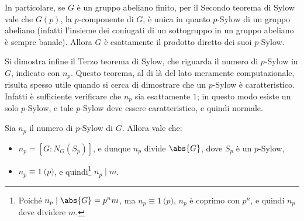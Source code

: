 \documentclass[12pt]{scrartcl}
\begin{document}
	\begin{remark}
		In particolare, se $G$ è un gruppo abeliano finito, per il
		Secondo teorema di Sylow vale che $G(p)$, la $p$-componente
		di $G$, è unica in quanto $p$-Sylow di un gruppo abeliano
		(infatti l'insieme dei coniugati di un sottogruppo in un gruppo abeliano è sempre banale). Allora $G$ è esattamente
		il prodotto diretto dei suoi $p$-Sylow.
	\end{remark}
	
	\bigskip
	
	
	Si dimostra infine il Terzo teorema di Sylow, che riguarda
	il numero di $p$-Sylow in $G$, indicato con $n_p$. Questo
	teorema, al di là del lato meramente computazionale, risulta
	spesso utile quando si cerca di dimostrare che un $p$-Sylow
	è caratteristico. Infatti è sufficiente verificare che
	$n_p$ sia esattamente $1$; in questo modo esiste un solo
	$p$-Sylow, e tale $p$-Sylow deve essere caratteristico, e
	quindi normale.
	
	\begin{theorem}
		Sia $n_p$ il numero di $p$-Sylow di $G$. Allora vale
		che:
		
		\begin{itemize}
			\item $n_p = [G : N_G(S_p)]$, e dunque $n_p$ divide $\abs{G}$, dove
				$S_p$ è un $p$-Sylow,
			\item $n_p \equiv 1 \pod p$, e quindi\footnote{
				Poiché $n_p \mid \abs{G} = p^n m$, ma $n_p \equiv 1 \pod p$, $n_p$ è coprimo con $p^n$, e quindi
				$n_p$ deve dividere $m$.
			} $n_p \mid m$.
		\end{itemize}
	\end{theorem}
	
\end{document}
